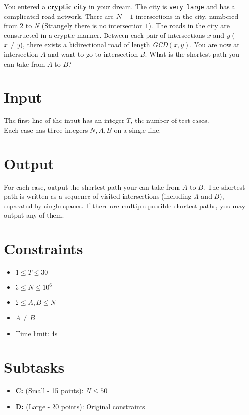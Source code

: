 
You entered a {\bf cryptic city} in your dream.
The city is {\tt very large} and has a complicated road network.
There are $N - 1$ intersections in the city, numbered from $2$ to $N$ (Strangely there is no intersection $1$).
The roads in the city are constructed in a cryptic manner.
Between each pair of intersections $x$ and $y$ ($x \neq y$), there exists a bidirectional road of length {\it GCD}$(x, y)$.
You are now at intersection $A$ and want to go to intersection $B$.
What is the shortest path you can take from $A$ to $B$?

\section*{Input}

The first line of the input has an integer $T$, the number of test cases.\\
Each case has three integers $N, A, B$ on a single line.

\section*{Output}

For each case, output the shortest path your can take from $A$ to $B$. The shortest path is written as a sequence of visited intersections (including $A$ and $B$), separated by single spaces. If there are multiple possible shortest paths, you may output any of them.

\section*{Constraints}
\begin{itemize}
\item $1 \leq T\leq 30$
\item $3 \leq N \leq 10^6$
\item $2 \leq A, B \leq N$
\item $A \neq B$
\item Time limit: 4s
\end{itemize}

\section*{Subtasks}
\begin{itemize}
  \item {\bf C:} (Small - 15 points): $N \leq 50$
  \item {\bf D:} (Large - 20 points): Original constraints
\end{itemize}

